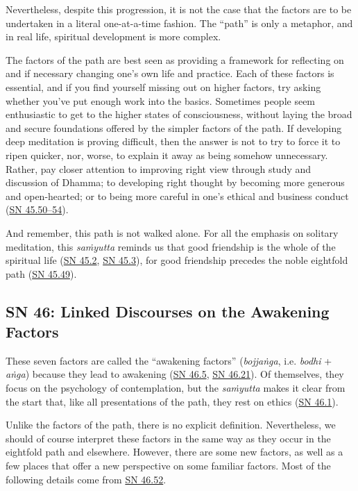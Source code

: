 \documentclass[12pt,openany]{book}%
\begin{document}
Nevertheless, despite this progression, it is not the case that the factors are to be undertaken in a literal one-at-a-time fashion. The “path” is only a metaphor, and in real life, spiritual development is more complex.

The factors of the path are best seen as providing a framework for reflecting on and if necessary changing one’s own life and practice. Each of these factors is essential, and if you find yourself missing out on higher factors, try asking whether you’ve put enough work into the basics. Sometimes people seem enthusiastic to get to the higher states of consciousness, without laying the broad and secure foundations offered by the simpler factors of the path. If developing deep meditation is proving difficult, then the answer is not to try to force it to ripen quicker, nor, worse, to explain it away as being somehow unnecessary. Rather, pay closer attention to improving right view through study and discussion of Dhamma; to developing right thought by becoming more generous and open-hearted; or to being more careful in one’s ethical and business conduct (\href{https://suttacentral.net/sn45.50}{SN 45.50–54}).

And remember, this path is not walked alone. For all the emphasis on solitary meditation, this \textit{\textsanskrit{saṁyutta}} reminds us that good friendship is the whole of the spiritual life (\href{https://suttacentral.net/sn45.2}{SN 45.2}, \href{https://suttacentral.net/sn45.3}{SN 45.3}), for good friendship precedes the noble eightfold path (\href{https://suttacentral.net/sn45.49}{SN 45.49}).

\subsection*{SN 46: Linked Discourses on the Awakening Factors}

These seven factors are called the “awakening factors” (\textit{\textsanskrit{bojjaṅga}}, i.e. \textit{bodhi} + \textit{\textsanskrit{aṅga}}) because they lead to awakening (\href{https://suttacentral.net/sn46.5}{SN 46.5}, \href{https://suttacentral.net/sn46.21}{SN 46.21}). Of themselves, they focus on the psychology of contemplation, but the \textit{\textsanskrit{saṁyutta}} makes it clear from the start that, like all presentations of the path, they rest on ethics (\href{https://suttacentral.net/sn46.1}{SN 46.1}).

Unlike the factors of the path, there is no explicit definition. Nevertheless, we should of course interpret these factors in the same way as they occur in the eightfold path and elsewhere. However, there are some new factors, as well as a few places that offer a new perspective on some familiar factors. Most of the following details come from \href{https://suttacentral.net/sn46.52}{SN 46.52}.
\end{document}
